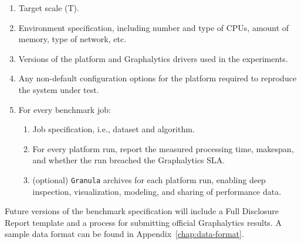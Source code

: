 \begin{enumerate}
	\item Target scale (T).
	\item Environment specification, including number and type of CPUs, amount of memory, type of network, etc.
	\item Versions of the platform and Graphalytics drivers used in the experiments.
	\item Any non-default configuration options for the platform required to reproduce the system under test.
	\item For every benchmark job:
		\begin{enumerate}
			\item Job specification, i.e., dataset and algorithm.
			\item For every platform run, report the measured processing time, makespan, and whether the run breached the Graphalytics SLA.
			\item (optional) {\tt Granula} archives for each platform run, enabling deep inspection, visualization, modeling, and sharing of performance data.  
		\end{enumerate}
		


\end{enumerate}
Future versions of the benchmark specification will include a Full Disclosure Report template and a process for submitting official Graphalytics results. A sample data format can be found in Appendix~\ref{chap:data-format}.


